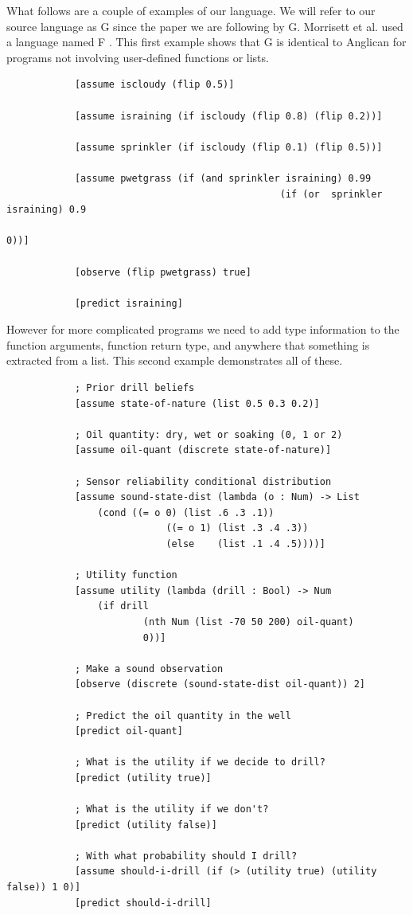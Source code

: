 \documentclass[a4paper]{article}
\begin{document}
What follows are a couple of examples of our language. We will refer to our source language as G since the paper we are following by G. Morrisett et al. used a language named F \cite{SystemF}. This first example shows that G is identical to Anglican for programs not involving user-defined functions or lists.
\begin{center}
	\begin{varwidth}{\linewidth}
		\small
		\begin{verbatim}
			[assume iscloudy (flip 0.5)]
			
			[assume israining (if iscloudy (flip 0.8) (flip 0.2))]
			
			[assume sprinkler (if iscloudy (flip 0.1) (flip 0.5))]
			
			[assume pwetgrass (if (and sprinkler israining) 0.99
												(if (or  sprinkler israining) 0.9
																											0))]
			
			[observe (flip pwetgrass) true]
			
			[predict israining]
		\end{verbatim}
	\end{varwidth}
\end{center}
However for more complicated programs we need to add type information to the function arguments, function return type, and anywhere that something is extracted from a list. This second example demonstrates all of these.
\begin{center}
	\begin{varwidth}{\linewidth}
		\small
		\begin{verbatim}
			; Prior drill beliefs
			[assume state-of-nature (list 0.5 0.3 0.2)] 

			; Oil quantity: dry, wet or soaking (0, 1 or 2)
			[assume oil-quant (discrete state-of-nature)]

			; Sensor reliability conditional distribution
			[assume sound-state-dist (lambda (o : Num) -> List
				(cond ((= o 0) (list .6 .3 .1))
							((= o 1) (list .3 .4 .3))
							(else    (list .1 .4 .5))))]

			; Utility function 
			[assume utility (lambda (drill : Bool) -> Num 
				(if drill
						(nth Num (list -70 50 200) oil-quant)
						0))]

			; Make a sound observation
			[observe (discrete (sound-state-dist oil-quant)) 2]

			; Predict the oil quantity in the well
			[predict oil-quant]

			; What is the utility if we decide to drill?
			[predict (utility true)]

			; What is the utility if we don't?
			[predict (utility false)]

			; With what probability should I drill?
			[assume should-i-drill (if (> (utility true) (utility false)) 1 0)]
			[predict should-i-drill]
		\end{verbatim}
	\end{varwidth}
\end{center}
\end{document}
